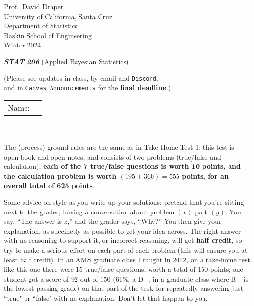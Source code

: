 \documentclass[12pt]{article}
\newcommand{\bi}[1]{\b{\i{#1}}}
\renewcommand{\b}[1]{\textbf{#1}}
\renewcommand{\i}[1]{\textit{#1}}
\renewcommand{\t}[1]{\texttt{#1}}
\begin{document}
\begin{flushleft}

Prof.~David Draper \\
University of California, Santa Cruz \\
Department of Statistics \\
Baskin School of Engineering \\
Winter 2024

\end{flushleft}

\Large

\begin{center}

\bi{STAT 206} (\textsf{Applied Bayesian Statistics})

\large

\fbox{\textsf{Take-Home Test 2} \bi{(625 Total Points)}}

(Please see updates in class, by email and \texttt{Discord}, \\ and in \t{Canvas Announcements} for the \textbf{final deadline}.)

\end{center}

\normalsize
\begin{tabular}{ll}

\hspace*{-0.14in} Name: \underline{\color{blue}{Devanathan Nallur Gandamani (2086936)} \hspace*{3.0in}} \\

\end{tabular}
\\ \\
The (process) ground rules are the same as in Take-Home Test 1: this test is open-book and open-notes, and consists of two problems (true/false and calculation); \textbf{each of the 7 true/false questions is worth 10 points, and the calculation problem is
worth $( 195 + 360 ) = 555$ points, for an overall total of 625 points}.

Some advice on style as you write up your solutions: pretend that you're sitting next to the grader, having a conversation about problem $( x )$ part $( y )$. You say, ``The answer is $z$,'' and the grader says, ``Why?'' You then give your explanation, as succinctly as possible to get your idea across. The right answer with no reasoning to support it, or incorrect reasoning, will get \textbf{half credit}, so try to make a serious effort on each part of each problem (this will ensure you at least half credit). In an AMS graduate class I taught in 2012, on a take-home test like this one there were 15 true/false questions, worth a total of 150 points; one student got a score of 92 out of 150 (61\%, a D$-$, in a graduate class where B$-$ is the lowest passing grade) on that part of the test, for repeatedly answering just ``true" or ``false" with no explanation. Don't let that happen to you.  
\end{document}
